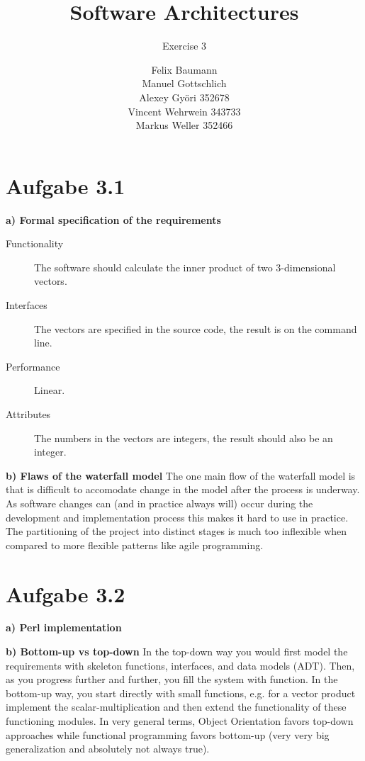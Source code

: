 \documentclass[a4paper,10pt]{scrartcl}[2003/01/01]
\title{Software Architectures}
\subtitle{Exercise 3}
\author{ Felix Baumann \\ Manuel Gottschlich \\  Alexey Gy\"ori 352678 \\ Vincent Wehrwein 343733\\ Markus Weller 352466}
\begin{document}
    \maketitle
    
    \section*{Aufgabe 3.1}
    \textbf{a) Formal specification of the requirements}
    \begin{description}
      \item[Functionality] The software should calculate the inner product of two 3-dimensional vectors.
      \item[Interfaces] The vectors are specified in the source code, the result is on the command line.
      \item[Performance] Linear.
      \item[Attributes] The numbers in the vectors are integers, the result should also be an integer. 
    \end{description}
    
    \textbf{b) Flaws of the waterfall model}
    The one main flow of the waterfall model is that is difficult to accomodate change in the model after the process is underway. As software changes can (and in practice always will) occur during the development and implementation process this makes it hard to use in practice. The partitioning of the project into distinct stages is much too inflexible when compared to more flexible patterns like agile programming.
    \newpage
    \section*{Aufgabe 3.2}
    \textbf{a) Perl implementation}
    
    \textbf{b) Bottom-up vs top-down}
    In the top-down way you would first model the requirements with skeleton functions, interfaces, and data models (ADT). Then, as you progress further and further, you fill the system with function. In the bottom-up way, you start directly with small functions, e.g. for a vector product implement the scalar-multiplication and then extend the functionality of these functioning modules. In very general terms, Object Orientation favors top-down approaches while functional programming favors bottom-up (very very big generalization and absolutely not always true).
\end{document}
